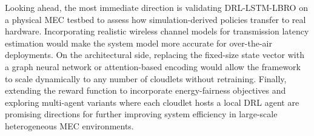 \documentclass[conference]{IEEEtran}
\begin{document}
Looking ahead, the most immediate direction is validating DRL-LSTM-LBRO
on a physical MEC testbed to assess how simulation-derived policies
transfer to real hardware. Incorporating realistic wireless channel
models for transmission latency estimation would make the system model
more accurate for over-the-air deployments. On the architectural side,
replacing the fixed-size state vector with a graph neural network
or attention-based encoding would allow the framework to scale
dynamically to any number of cloudlets without retraining. Finally,
extending the reward function to incorporate energy-fairness objectives
and exploring multi-agent variants where each cloudlet hosts a local
DRL agent are promising directions for further improving system
efficiency in large-scale heterogeneous MEC environments.


\end{document}
